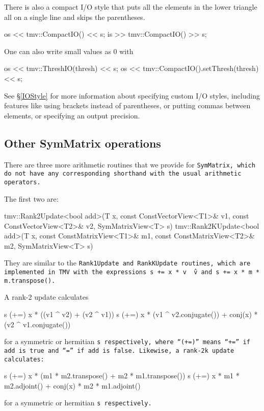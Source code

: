 There is also a compact I/O style that puts all the elements in the lower triangle all on a single line and skips the parentheses. 
\begin{tmvcode}
os << tmv::CompactIO() << s;
is >> tmv::CompactIO() >> s;
\end{tmvcode}

One can also write small values as 0 with
\begin{tmvcode}
os << tmv::ThreshIO(thresh) << s;
os << tmv::CompactIO().setThresh(thresh) << s;
\end{tmvcode}

See \S\ref{IOStyle} for more information about specifying custom I/O styles, including
features like using brackets instead of parentheses, or putting commas between elements,
or specifying an output precision.  

\subsection{Other SymMatrix operations}
\label{SymMatrix_Ops}

There are three more arithmetic routines that we provide for \tt{SymMatrix},
which do not have
any corresponding shorthand with the usual arithmetic operators.

The first two are:
\begin{tmvcode}
tmv::Rank2Update<bool add>(T x, const ConstVectorView<T1>& v1, 
      const ConstVectorView<T2>& v2, SymMatrixView<T> s)
tmv::Rank2KUpdate<bool add>(T x, const ConstMatrixView<T1>& m1, 
      const ConstMatrixView<T2>& m2, SymMatrixView<T> s)
\end{tmvcode}
They are similar to the \tt{Rank1Update} and \tt{RankKUpdate} routines,
which are implemented in TMV with the expressions 
\tt{s += x * v \^\ v} and \tt{s += x * m * m.transpose()}.

A rank-2 update calculates
\begin{tmvcode}
s (+=) x * ((v1 ^ v2) + (v2 ^ v1))
s (+=) x * (v1 ^ v2.conjugate()) + conj(x) * (v2 ^ v1.conjugate())
\end{tmvcode}
for a symmetric or hermitian \tt{s} respectively,
where ``(+=)'' means ``+='' if \tt{add} is \tt{true} and ``='' 
if \tt{add} is \tt{false}.
Likewise, a rank-2k update calculates:
\begin{tmvcode}
s (+=) x * (m1 * m2.transpose() + m2 * m1.transpose())
s (+=) x * m1 * m2.adjoint() + conj(x) * m2 * m1.adjoint()
\end{tmvcode}
for a symmetric or hermitian \tt{s} respectively.

